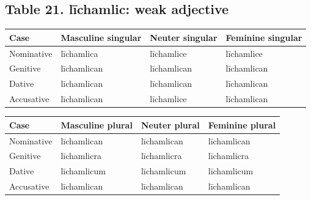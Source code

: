 \subsection*{Table 21. līchamlic: weak adjective}

\par\begingroup
\fontsize{10.5}{13.2}\selectfont
\setlength{\LTleft}{0pt}\setlength{\LTright}{\fill}
\noindent
\begin{tabular}{@{}>{\raggedright\arraybackslash}p{22.0mm}>{\raggedright\arraybackslash}p{31.188mm}>{\raggedright\arraybackslash}p{31.188mm}>{\raggedright\arraybackslash}p{31.188mm}@{}}
\toprule
\textbf{Case} & \textbf{Masculine singular} & \textbf{Neuter singular} & \textbf{Feminine singular} \\
\midrule
Nominative & līchamlica & līchamlice & līchamlice \\
Genitive & līchamlican & līchamlican & līchamlican \\
Dative & līchamlican & līchamlican & līchamlican \\
Accusative & līchamlican & līchamlice & līchamlican \\
\bottomrule
\end{tabular}
\par\endgroup
\par\addvspace{5pt}
\par\begingroup
\fontsize{10.5}{13.2}\selectfont
\setlength{\LTleft}{0pt}\setlength{\LTright}{\fill}
\noindent
\begin{tabular}{@{}>{\raggedright\arraybackslash}p{22.0mm}>{\raggedright\arraybackslash}p{31.188mm}>{\raggedright\arraybackslash}p{31.188mm}>{\raggedright\arraybackslash}p{31.188mm}@{}}
\toprule
\textbf{Case} & \textbf{Masculine plural} & \textbf{Neuter plural} & \textbf{Feminine plural} \\
\midrule
Nominative & līchamlican & līchamlican & līchamlican \\
Genitive & līchamlicra & līchamlicra & līchamlicra \\
Dative & līchamlicum & līchamlicum & līchamlicum \\
Accusative & līchamlican & līchamlican & līchamlican \\
\bottomrule
\end{tabular}
\par\endgroup

